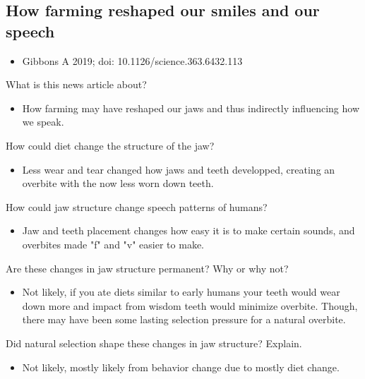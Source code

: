\documentclass[12pt,a4paper]{article}
\begin{document}
\subsection{How farming reshaped our smiles and our speech}
\begin{itemize}
    \item Gibbons A 2019; doi: 10.1126/science.363.6432.113
\end{itemize}
\begin{enumerate}
    {\color{darklc}\item What is this news article about?}
        \begin{itemize}
            \item How farming may have reshaped our jaws and thus indirectly influencing how we speak.
        \end{itemize}
    {\color{darklc}\item How could diet change the structure of the jaw?}
        \begin{itemize}
            \item Less wear and tear changed how jaws and teeth developped, creating an overbite with the now less worn down teeth.
        \end{itemize}
    {\color{darklc}\item How could jaw structure change speech patterns of humans?}
        \begin{itemize}
            \item Jaw and teeth placement changes how easy it is to make certain sounds, and overbites made "f" and "v" easier to make.
        \end{itemize}
    {\color{darklc}\item Are these changes in jaw structure permanent? Why or why not?}
        \begin{itemize}
            \item Not likely, if you ate diets similar to early humans your teeth would wear down more and impact from wisdom teeth would minimize overbite. Though, there may have been some lasting selection pressure for a natural overbite.
        \end{itemize}
    {\color{darklc}\item Did natural selection shape these changes in jaw structure? Explain.}
        \begin{itemize}
            \item Not likely, mostly likely from behavior change due to mostly diet change.
        \end{itemize}

\end{enumerate}
\end{document}
